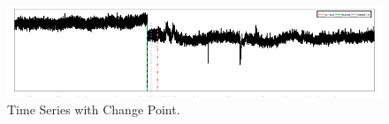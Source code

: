 \begin{figure}[t!]
  \includegraphics[width=\linewidth]{cp_z.png}
  \caption{Time Series with Change Point.}
  \label{f1}
  
\vspace*{-0.6cm}

\end{figure}


